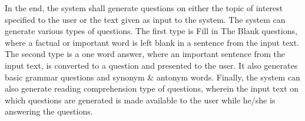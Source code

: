 In the end, the system shall generate questions on either the topic of interest
specified to the user or the text given as input to the system. The system can
generate various types of questions. The first type is Fill in The Blank
questions, where a factual or important word is left blank in a sentence from
the input text. The second type is a one word answer, where an important
sentence from the input text, is converted to a question and presented to the
user. It also generates basic grammar questions and synonym \& antonym words.
Finally, the system can also generate reading comprehension type of questions,
wherein the input text on which questions are generated is made available to the
user while he/she is answering the questions.
